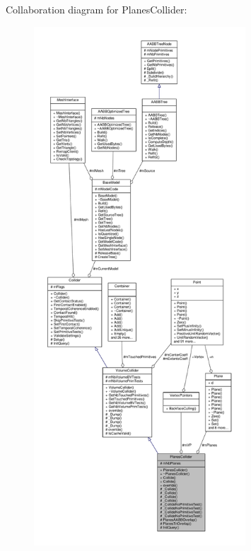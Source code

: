 Collaboration diagram for Planes\+Collider\+:
\nopagebreak
\begin{figure}[H]
\begin{center}
\leavevmode
\includegraphics[height=550pt]{d2/d8b/classPlanesCollider__coll__graph}
\end{center}
\end{figure}
